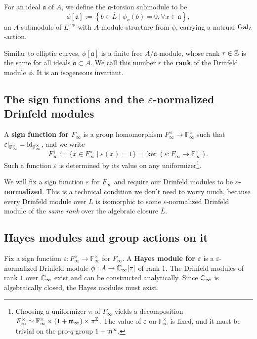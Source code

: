 \documentclass{article}
\newcommand{\F}{\mathbb{F}}
\newcommand{\sep}{\mathrm{sep}}
\newcommand{\m}{\mathfrak{m}}
\begin{document}
For an ideal $\mathfrak{a}$ of $A$,
we define the $\mathfrak{a}$-torsion submodule to be\[\phi[\mathfrak{a}] :=
\left\{ b\in\bar L\mid \phi_x(b) = 0,\forall x\in\mathfrak{a} \right\},\]
an $A$-submodule of $L^\sep$ with $A$-module structure from $\phi$,
carrying a natrual $\operatorname{Gal}_L$-action.

Similar to elliptic curves,
$\phi[\mathfrak{a}]$ is a finite free $A/\mathfrak{a}$-module, whose rank $r\in \mathbb{Z}$ is the same for all ideals $\mathfrak{a}\subset A$.
We call this number $r$ the \textbf{rank} of the Drinfeld module $\phi$.
It is an isogeneous invariant.

\subsection{The sign functions and the \texorpdfstring{$\varepsilon$}{epsilon}-normalized Drinfeld modules}
A \textbf{sign function for $F_\infty$} is a
group homomorphism $F_\infty^\times\to\F_\infty^\times$ such that $\varepsilon|_{\F_\infty^\times} = \Id_{\F_\infty^\times}$, and we write \[F_\infty^+ := \{x\in F_\infty^\times\mid \varepsilon(x) = 1\} = \ker(\varepsilon : F_\infty\to \F_\infty^\times).\]
Such a function $\varepsilon$ is determined by its value on any uniformizer\footnote{
    Choosing a uniformizer $\pi$ of $F_\infty$ yields a decomposition $F_\infty^\times\simeq \F_\infty^\times\times (1 + \m_\infty)\times \pi^{\Z}$.
    The value of $\varepsilon$ on $\F_\infty^\times$ is fixed,
    and it must be trivial on the pro-$q$ group $1 + \m^\infty$.
}.

We will fix a sign function $\varepsilon$ for $F_\infty$ and require our Drinfeld modules to be \textbf{$\varepsilon$-normalized}. This is a technical condition we don't need to worry much,
because every Drinfeld module over $L$ is isomorphic to some $\varepsilon$-normalized Drinfeld module of the \textit{same rank} over the algebraic closure $\bar L$.

\subsection{Hayes modules and group actions on it}

Fix a sign function $\varepsilon : F_\infty^\times\to\F_\infty^\times$ for $F_\infty$.
A \textbf{Hayes module for $\varepsilon$}
is a $\varepsilon$-normalized Drinfeld module $\phi : A\to \mathbb{C}_\infty[\tau]$ of rank $1$.
The Drinfeld modules of rank $1$ over $\mathbb{C}_\infty$ exist and can be constructed analytically.
Since $\mathbb{C}_\infty$ is algebraically closed, the Hayes modules must exist.
\end{document}
